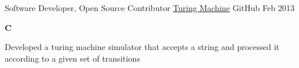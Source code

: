 \begin{cventries}
{\begin{cvitems}
      \end{cvitems}
    }
  \cventry
    {Software Developer, Open Source Contributor}
    {\href{https://github.com/yedhukrishnan/turing-machine}{Turing Machine}}
    {GitHub}
    {Feb 2013}
    {
      \begin{cvitems}
        \item {\textbf{C}}
        \item {Developed a turing machine simulator that accepts a string and processed it according to a given set of transitions}
      \end{cvitems}
    }
\end{cventries}
